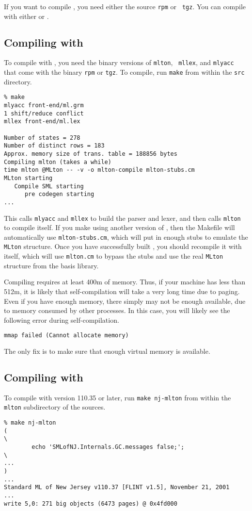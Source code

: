 
If you want to compile {\mlton}, you need either the source {\tt rpm} or {\tt
tgz}.  You can compile with either {\mlton} or {\smlnj}.

\subsection{Compiling with {\mlton}}

To compile with {\mlton}, you need the binary versions of {\tt mlton}, {\tt
mllex}, and {\tt mlyacc} that come with the binary {\tt rpm} or {\tt tgz}.  To
compile, run {\tt make} from within the {\tt src} directory.
\begin{verbatim}
% make
mlyacc front-end/ml.grm
1 shift/reduce conflict
mllex front-end/ml.lex

Number of states = 278
Number of distinct rows = 183
Approx. memory size of trans. table = 188856 bytes
Compiling mlton (takes a while)
time mlton @MLton -- -v -o mlton-compile mlton-stubs.cm
MLton starting
   Compile SML starting
      pre codegen starting
...
\end{verbatim}
This calls {\tt mlyacc} and {\tt mllex} to build the parser and lexer, and then
calls {\tt mlton} to compile itself.  If you make {\mlton} using another version
of {\mlton}, then the Makefile will automatically use {\tt mlton-stubs.cm},
which will put in enough stubs to emulate the {\tt MLton} structure.  Once you
have successfully built {\mlton}, you should recompile it with itself, which
will use {\tt mlton.cm} to bypass the stubs and use the real {\tt MLton}
structure from the basis library.

Compiling {\mlton} requires at least 400m of memory.  Thus, if your machine has
less than 512m, it is likely that self-compilation will take a very long time
due to paging.  Even if you have enough memory, there simply may not be enough
available, due to memory consumed by other processes.  In this case, you will
likely see the following error during self-compilation.
\begin{verbatim}
mmap failed (Cannot allocate memory)
\end{verbatim}
The only fix is to make sure that enough virtual memory is available.

\subsection{Compiling with {\smlnj}}

To compile with {\smlnj} version 110.35 or later, run {\tt make nj-mlton} from
within the {\tt mlton} subdirectory of the sources.
\begin{verbatim}
% make nj-mlton
(                                                                       \
        echo 'SMLofNJ.Internals.GC.messages false;';                    \
...
)
...
Standard ML of New Jersey v110.37 [FLINT v1.5], November 21, 2001
...
write 5,0: 271 big objects (6473 pages) @ 0x4fd000
\end{verbatim}
